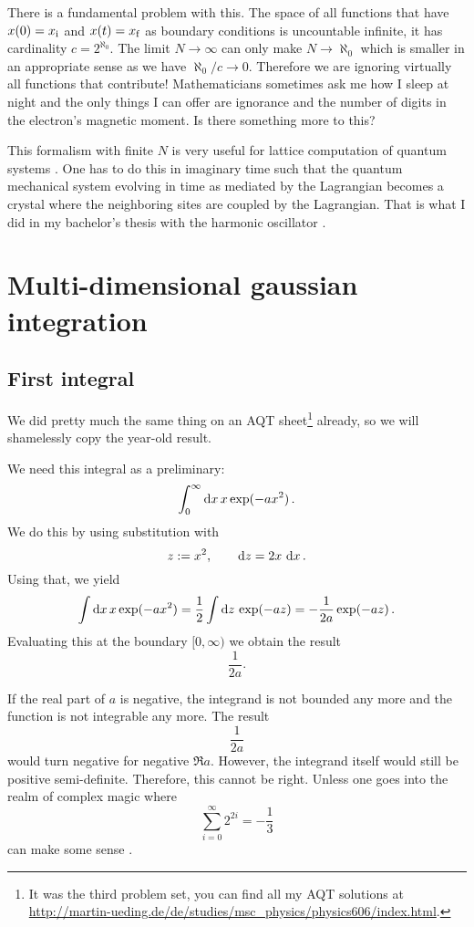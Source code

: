 \documentclass[11pt, english, fleqn, DIV=15, headinclude]{scrartcl}
\begin{document}
\begin{question}
    There is a fundamental problem with this. The space of all functions that
    have $x(0) = x_\mathrm i$ and $x(t) = x_\mathrm f$ as boundary conditions is uncountable
    infinite, it has cardinality $c = 2^{\aleph_0}$. The limit $N \to \infty$
    can only make $N \to \aleph_0$ which is smaller in an appropriate sense as
    we have $\aleph_0/c \to 0$. Therefore we are ignoring virtually all
    functions that contribute! Mathematicians sometimes ask me how I sleep at
    night and the only things I can offer are ignorance and the number of
    digits in the electron's magnetic moment. Is there something more to this?
\end{question}


This formalism with finite $N$ is very useful for lattice computation of
quantum systems \parencite{Creutz/Statistical_Approach_QM}. One has to do this
in imaginary time such that the quantum mechanical system evolving in time as
mediated by the Lagrangian becomes a crystal where the neighboring sites are
coupled by the Lagrangian. That is what I did in my bachelor's thesis with the
harmonic oscillator \parencite{Ueding/Bachelorarbeit}.

\section{Multi-dimensional gaussian integration}
\label{homework:2}

\subsection{First integral}

We did pretty much the same thing on an AQT sheet\footnote{It was the third
problem set, you can find all my AQT solutions at\\
\url{http://martin-ueding.de/de/studies/msc_physics/physics606/index.html}.}
already, so we will shamelessly copy the year-old result.

We need this integral as a preliminary:
\[
    \int_0^\infty \mathop{}\!\mathrm d x \, x \exp(-ax^2) \,.
\]
We do this by using substitution with
\[
    z := x^2
    ,\qquad
    \mathop{}\!\mathrm d z = 2 x \, \mathop{}\!\mathrm d x \,.
\]
Using that, we yield
\[
    \int \mathop{}\!\mathrm d x \, x \exp(-ax^2) = \frac{1}{2} \int \mathop{}\!\mathrm d z \, \exp(-az) = -
    \frac{1}{2a} \exp(-az) \,.
\]
Evaluating this at the boundary $[0, \infty)$ we obtain the result
\[
    \frac{1}{2a}.
\]

If the real part of $a$ is negative, the integrand is not bounded any more and
the function is not integrable any more. The result
\[
    \frac{1}{2a}
\]
would turn negative for negative $\Re a$. However, the integrand itself would
still be positive semi-definite. Therefore, this cannot be right. Unless one
goes into the realm of complex magic where
\[
    \sum_{i = 0}^\infty 2^{2i} = - \frac{1}{3}
\]
can make some sense \parencite[78]{penrose-road_to_reality}.
\end{document}
